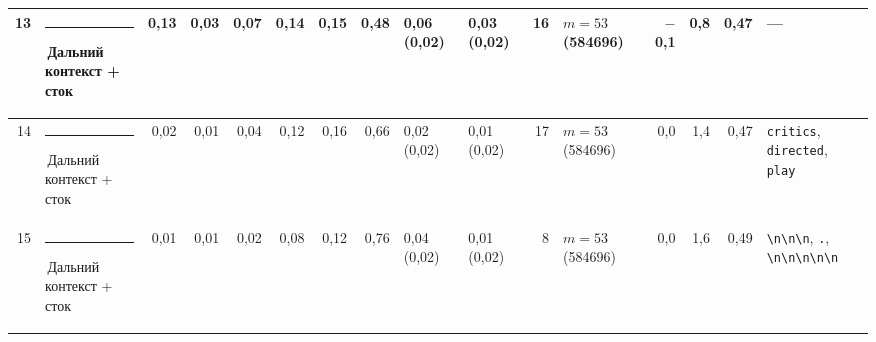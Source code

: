 \documentclass[10pt]{article}
\begin{document}
\begin{minipage}{\linewidth}
\begin{center}
{\begin{tabular}{|r|l|r|r|r|r|r|r|l|l|r|l|r|r|r|l|}
13 & \textcolor[HTML]{C3C2B7}{\rule{0.62em}{0.62em}}\,Дальний контекст + сток & 0,13 & 0,03 & 0,07 & 0,14 & 0,15 & 0,48 & 0,06 (0,02) & 0,03 (0,02) & 16 & $m{=}53$ (584696) & $-$0,1 & 0,8 & 0,47 & — \\ \hline
14 & \textcolor[HTML]{C3C2B7}{\rule{0.62em}{0.62em}}\,Дальний контекст + сток & 0,02 & 0,01 & 0,04 & 0,12 & 0,16 & 0,66 & 0,02 (0,02) & 0,01 (0,02) & 17 & $m{=}53$ (584696) & 0,0 & 1,4 & 0,47 & \texttt{\textvisiblespace{}critics}, \texttt{\textvisiblespace{}directed}, \texttt{\textvisiblespace{}play} \\ \hline
15 & \textcolor[HTML]{C3C2B7}{\rule{0.62em}{0.62em}}\,Дальний контекст + сток & 0,01 & 0,01 & 0,02 & 0,08 & 0,12 & 0,76 & 0,04 (0,02) & 0,01 (0,02) & 8 & $m{=}53$ (584696) & 0,0 & 1,6 & 0,49 & \texttt{\textvisiblespace{}\textbackslash{}n\textbackslash{}n\textbackslash{}n}, \texttt{\textvisiblespace{}.}, \texttt{\textvisiblespace{}\textbackslash{}n\textbackslash{}n\textbackslash{}n\textbackslash{}n\textbackslash{}n} \\ \hline
\hline\end{tabular}}\end{center}
\end{minipage}
\par\vspace{0.4em}
\end{document}
